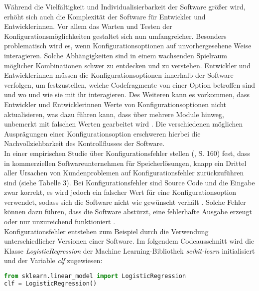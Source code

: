 \documentclass[german,bachelor]{swsLeipzig}
\begin{document}
W\"ahrend die Vielf\"altigkeit und Individualisierbarkeit der Software gr\"o\ss er wird, erh\"oht sich auch die Komplexit\"at der Software f\"ur Entwickler und Entwicklerinnen.
Vor allem das Warten und Testen der Konfigurationsmöglichkeiten gestaltet sich nun umfangreicher.
Besonders problematisch wird es, wenn Konfigurationsoptionen auf unvorhergesehene Weise interagieren.
Solche Abh\"angigkeiten sind in einem wachsenden Spielraum m\"oglicher Kombinationen schwer zu entdecken und zu verstehen.
Entwickler und Entwicklerinnen m\"ussen die Konfigurationsoptionen innerhalb der Software verfolgen, um festzustellen,
welche Codefragmente von einer Option betroffen sind und wo und wie sie mit ihr interagieren.
Des Weiteren kann es vorkommen, dass Entwickler und Entwicklerinnen Werte von Konfigurationsoptionen nicht aktualisieren, was dazu führen kann,
dass über mehrere Module hinweg, unbemerkt mit falschen Werten gearbeitet wird \cite[S. 185]{7774519}.
Die verschiedenen m\"oglichen Auspr\"agungen einer Konfigurationsoption erschweren hierbei die Nachvollziehbarkeit des Kontrollflusses der Software.\\

In einer empirischen Studie über Konfigurationsfehler stellen \citeauthor{10.1145/2043556.2043572} (\citeyear{10.1145/2043556.2043572}, S. 160) fest,
dass in kommerziellen Softwareunternehmen für Speicherlösungen, knapp ein Drittel aller Ursachen von Kundenproblemen auf Konfigurationsfehler zurückzuführen sind (siehe Tabelle 3).
Bei Konfigurationsfehler sind Source Code und die Eingabe zwar korrekt, es wird jedoch ein falscher Wert für eine Konfigurationsoption verwendet,
sodass sich die Software nicht wie gewünscht verhält \cite[S. 152]{10.1145/2568225.2568251}.
Solche Fehler können dazu führen, dass die Software abstürzt, eine fehlerhafte Ausgabe erzeugt oder nur unzureichend funktioniert \cite[S. 152]{10.1145/2568225.2568251}.\\

Konfigurationsfehler entstehen zum Beispiel durch die Verwendung unterschiedlicher Versionen einer Software.
Im folgendem Codeausschnitt wird die Klasse \textit{LogisticRegression} der Machine Learning-Bibliothek \textit{scikit-learn} initialisiert und der Variable \textit{clf} zugewiesen:\\

\begin{lstlisting}[language=Python, frame=single, basicstyle=\small]
from sklearn.linear_model import LogisticRegression
clf = LogisticRegression()
\end{lstlisting}
\
\end{document}
